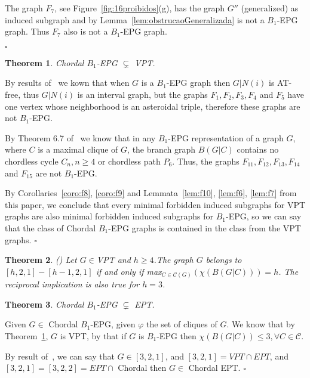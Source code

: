 \documentclass[9pt]{entcs}
\newtheorem{teo}{Theorem}[section]
\begin{document}
\begin{pf}
The graph $F_7$, see Figure~\ref{fig:16proibidos}(g), has the graph $G''$ (generalized) as induced subgraph and by Lemma~\ref{lem:obstrucaoGeneralizada} is not a $B_1$-EPG graph. Thus $F_7$ also is not a $B_1$-EPG graph.

%
 $\square$\end{pf} 



\begin{teo}\label{lem:chordalB1inVPT}
Chordal $B_1$-EPG $\subsetneq$ VPT. 
\end{teo}

\begin{pf}
By results of~\cite{Asinowski2009} we kown that when $G$ is a $B_1$-EPG graph then $G|N(i)$ is AT-free, thus $G|N(i)$ is an interval graph, but the graphs $F_{1}, F_{2}, F_{3}, F_{4}$ and $F_{5}$ have one vertex whose neighborhood is an asteroidal triple, therefore these graphs are not  $B_1$-EPG.

By Theorem 6.7 of~\cite{golumbic2009} we know that in any $B_1$-EPG representation of a graph $G$, where $C$ is a maximal clique of $G$, the branch graph $B(G|C)$ contains no chordless cycle $C_n, n\geq 4$ or chordless path $P_6$. Thus, the graphs $F_{11}, F_{12}, F_{13}, F_{14}$ and $F_{15}$ are not $B_1$-EPG.

By Corollaries~\ref{coro:f8}, \ref{coro:f9} and Lemmata~\ref{lem:f10}, \ref{lem:f6}, \ref{lem:f7} from this paper, we conclude that every minimal forbidden induced subgraphs for VPT graphs are also minimal forbidden induced subgraphs for $B_1$-EPG, so we can say that the class of Chordal $B_1$-EPG graphs is contained in the class from the VPT graphs. 
 $\square$\end{pf} 

\begin{teo}
(\cite{alcon2014recognizing}) Let $G\in$VPT and $h\geq 4$.The graph $G$ belongs to $[h,2,1]-[h-1,2,1]$ if and only if max$_{C\in\mathcal{C}(G)}(\chi (B(G|C)))=h$. The reciprocal implication is also true for $h=3$.
\end{teo}



\begin{teo}
Chordal $B_1$-EPG $\subsetneq$ EPT. 
\end{teo}

\begin{pf}
Given $G \in$ Chordal $B_1$-EPG, given $\varphi$ the set of cliques of $G$. We know that by Theorem~\ref{lem:chordalB1inVPT}, $G$ is VPT, by \cite{golumbic2009} that if $G$ is $B_1$-EPG then $\chi (B(G|C))\leq 3, \forall C \in \mathcal{C}$.

By result of~\cite{alcon2014recognizing}, we can say that $G \in [3,2,1]$, and $[3,2,1] = VPT \cap EPT$, and $[3,2,1] = [3,2,2] = EPT \cap$ Chordal  then $G \in$ Chordal EPT.
 $\square$\end{pf} 
\end{document}

